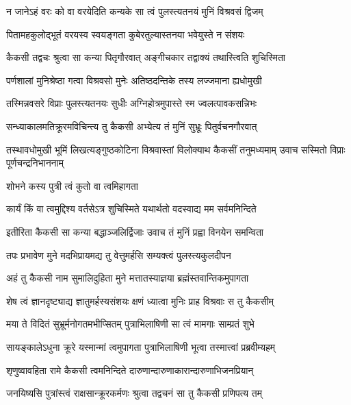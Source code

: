 \twolineshloka
{न जानेऽहं वरः को वा वरयेदिति कन्यके}
{सा त्वं पुलस्त्यतनयं मुनिं विश्रवसं द्विजम्}%

\twolineshloka
{पितामहकुलोद्भूतं वरयस्व स्वयङ्गता}
{कुबेरतुल्यास्तनया भवेयुस्ते न संशयः}%

\twolineshloka
{कैकसी तद्वचः श्रुत्वा सा कन्या पितृगौरवात्}
{अङ्गीचकार तद्वाक्यं तथास्त्विति शुचिस्मिता}%

\twolineshloka
{पर्णशालां मुनिश्रेष्ठा गत्वा विश्रवसो मुनेः}
{अतिष्ठदन्तिके तस्य लज्जमाना ह्यधोमुखी}%

\twolineshloka
{तस्मिन्नवसरे विप्राः पुलस्त्यतनयः सुधीः}
{अग्निहोत्रमुपास्ते स्म ज्वलत्पावकसन्निभः}%

\twolineshloka
{सन्ध्याकालमतिक्रूरमविचिन्त्य तु कैकसी}
{अभ्येत्य तं मुनिं सुभ्रूः पितुर्वचनगौरवात्}%

\threelineshloka
{तस्थावधोमुखी भूमिं लिखत्यङ्गुष्ठकोटिना}
{विश्रवास्तां विलोक्याथ कैकसीं तनुमध्यमाम्}
{उवाच सस्मितो विप्राः पूर्णचन्द्रनिभाननाम्}%


\onelineshloka
{शोभने कस्य पुत्री त्वं कुतो वा त्वमिहागता}%

\twolineshloka
{कार्यं किं वा त्वमुद्दिश्य वर्तसेऽत्र शुचिस्मिते}
{यथार्थतो वदस्वाद्य मम सर्वमनिन्दिते}%

\twolineshloka
{इतीरिता कैकसी सा कन्या बद्धाञ्जलिर्द्विजाः}
{उवाच तं मुनिं प्रह्वा विनयेन समन्विता}%

\twolineshloka
{तपः प्रभावेण मुने मदभिप्रायमद्य तु}
{वेत्तुमर्हसि सम्यक्त्वं पुलस्त्यकुलदीपन}%

\twolineshloka
{अहं तु कैकसी नाम सुमालिदुहिता मुने}
{मत्तातस्याज्ञया ब्रह्मंस्तवान्तिकमुपागता}%

\twolineshloka
{शेष त्वं ज्ञानदृष्ट्याद्य ज्ञातुमर्हस्यसंशयः}
{क्षणं ध्यात्वा मुनिः प्राह विश्रवाः स तु कैकसीम्}%

\twolineshloka
{मया ते विदितं सुभ्रूर्मनोगतमभीप्सितम्}
{पुत्राभिलाषिणी सा त्वं मामगाः साम्प्रतं शुभे}%

\twolineshloka
{सायङ्कालेऽधुना क्रूरे यस्मान्मां त्वमुपागता}
{पुत्राभिलाषिणी भूत्वा तस्मात्त्वां प्रब्रवीम्यहम्}%

\twolineshloka
{शृणुष्वावहिता रामे कैकसी त्वमनिन्दिते}
{दारुणान्दारुणाकारान्दारुणाभिजनप्रियान्}%

\twolineshloka
{जनयिष्यसि पुत्रांस्त्वं राक्षसान्क्रूरकर्मणः}
{श्रुत्वा तद्वचनं सा तु कैकसी प्रणिपत्य तम्}%

